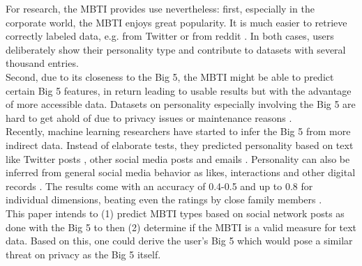 For research, the MBTI provides use nevertheless: first, especially in the corporate world, the MBTI enjoys great popularity. It is much easier to retrieve correctly labeled data, e.g. from Twitter  \cite{plank_personality_2015} or from reddit \cite{gjurkovic_reddit:_2018}. In both cases, users deliberately show their personality type and contribute to datasets with several thousand entries.\\
Second, due to its closeness to the Big 5, the MBTI might be able to predict certain Big 5 features, in return leading to usable results but with the advantage of more accessible data. Datasets on personality especially involving the Big 5 are hard to get ahold of due to privacy issues or maintenance reasons \cite{stillwell_mypersonality_2018}.\\
Recently, machine learning researchers have started to infer the Big 5 from more indirect data. Instead of elaborate tests, they predicted personality based on text \cite{mairesse_using_2007,pennebaker_linguistic_1999}
like Twitter posts \cite{golbeck_predicting_2011,quercia_our_2011}, other social media posts \cite{schwartz_personality_2013} and emails \cite{oberlander_language_2006}. Personality can also be inferred from general social media behavior as likes, interactions and other digital records \cite{kosinski_private_2013,kosinski_manifestations_2014,youyou_computer-based_2015}. The results come with an accuracy of 0.4-0.5 and up to 0.8 for individual dimensions, beating even the ratings by close family members \cite{youyou_computer-based_2015}.\\
This paper intends to (1) predict MBTI types based on social network posts as done with the Big 5 to then (2) determine if the MBTI is a valid measure for text data. Based on this, one could derive the user's Big 5 which would pose a similar threat on privacy as the Big 5 itself.